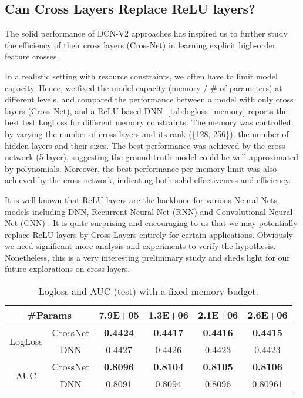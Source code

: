 \documentclass[sigconf]{acmart}
\begin{document}
\subsection{Can Cross Layers Replace ReLU layers?}
\label{sec:crossnet_performance}
The solid performance of {DCN-V2} approaches has inspired us to further study the efficiency of their cross layers (CrossNet) in learning explicit high-order feature crosses.


In a realistic setting with resource constraints, we often have to limit model capacity. Hence, we fixed the model capacity (memory / \# of parameters) at different levels, and compared the performance between a model with only cross layers (Cross Net), and a ReLU based DNN. \autoref{tab:logloss_memory} reports the best test LogLoss for different memory constraints. The memory was controlled by varying the number of cross layers and its rank (\{128, 256\}), the number of hidden layers and their sizes. The best performance was achieved by the cross network (5-layer), suggesting the ground-truth model could be well-approximated by polynomials. Moreover, the best performance per memory limit was also achieved by the cross network, indicating both solid effectiveness and efficiency.

It is well known that ReLU layers are the backbone for various Neural Nets models including DNN, Recurrent Neural Net (RNN) \cite{rumelhart1985learning, hochreiter1997long, mikolov2011extensions} and Convolutional Neural Net (CNN) \cite{lecun1989backpropagation, schmidhuber2015deep, lawrence1997face}. It is quite surprising and encouraging to us that we may potentially replace ReLU layers by Cross Layers entirely for certain applications. Obviously we need significant more analysis and experiments to verify the hypothesis. Nonetheless, this is a very interesting preliminary study and sheds light for our future explorations on cross layers.

\begin{table}[htbp]
\small
\vspace{-4pt}
\caption{Logloss and AUC (test) with a fixed memory budget.}
\vspace{-10pt}
\label{tab:logloss_memory}
\begin{center}
\begin{tabular}{cc|cccc}
\toprule
\multicolumn{2}{c|}{\bf \#Params} & 7.9E+05 & 1.3E+06 & 2.1E+06 & 2.6E+06\\
\midrule
\multirow{ 2}{*}{LogLoss}& CrossNet & \bf 0.4424 & \bf 0.4417 & \bf 0.4416 & \bf 0.4415\\
 &  DNN & 0.4427 & 0.4426 & 0.4423 & 0.4423\\
 \midrule
\multirow{ 2}{*}{AUC} &  CrossNet & \bf 0.8096 & \bf 0.8104 & \bf 0.8105  & \bf 0.8106\\
& DNN & 0.8091 & 0.8094  & 0.8096 & 0.80961 \\

\bottomrule
\end{tabular}
\end{center}
\vspace{-4pt}
\end{table}
\end{document}
